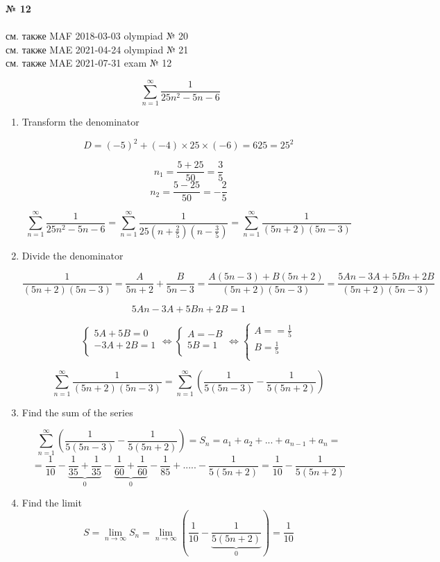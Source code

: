 \documentclass{article}
\begin{document}
\textbf{№ 12} 
\\
\\ см. также {\color{blue}MAF} 2018-03-03 olympiad № 20
\\ см. также {\color{red}MAE} 2021-04-24 olympiad № 21
\\ см. также {\color{red}MAE} 2021-07-31 exam № 12

$$\sum_{n=1}^{\infty} \frac{1}{25n^2-5n-6}$$

\begin{enumerate}

\item Transform the denominator

$$D = (-5)^2 + (-4)\times25\times(-6)=625=25^2$$

$$n_1 = \frac{5+25}{50}=\frac{3}{5}$$
$$n_2 = \frac{5-25}{50}=-\frac{2}{5}$$

$$\sum_{n=1}^{\infty} \frac{1}{25n^2-5n-6} = \sum_{n=1}^{\infty} \frac{1}{25(n+\frac{2}{5})(n-\frac{3}{5})} = \sum_{n=1}^{\infty} \frac{1}{(5n+2)(5n-3)}$$

\item Divide the denominator

$$\frac{1}{(5n+2)(5n-3)} = \frac{A}{5n+2} + \frac{B}{5n-3} 
= \frac{A(5n-3)+B(5n+2)}{(5n+2)(5n-3)} 
= \frac{5An-3A+5Bn+2B}{(5n+2)(5n-3)}$$

$$5An-3A+5Bn+2B = 1$$

$$
\left\{
  \begin{array}{ccc}
    5A + 5B = 0 \\
    -3A+2B = 1 \\
  \end{array}\Leftrightarrow
\right.
\left\{
  \begin{array}{ccc}
    A = -B \\
    5B = 1 \\
  \end{array}\Leftrightarrow
\right.
\left\{
  \begin{array}{ccc}
    A = =\frac{1}{5} \\
    B = \frac{1}{5} \\
  \end{array}
\right.
$$

$$ \sum_{n=1}^{\infty} \frac{1}{(5n+2)(5n-3)} = 
\sum_{n=1}^{\infty} \left(\frac{1}{5(5n-3)} - \frac{1}{5(5n+2)}\right) $$

\item Find the sum of the series

$$ \sum_{n=1}^{\infty} \left(\frac{1}{5(5n-3)} - \frac{1}{5(5n+2)}\right) 
= S_n = a_1+a_2+...+a_{n-1}+a_n = $$
$$ = \frac{1}{10} - \underbrace{\frac{1}{35} + \frac{1}{35}}_{0} - \underbrace{\frac{1}{60} + \frac{1}{60}}_{0} - \frac{1}{85} + ..... - \frac{1}{5(5n+2)} = \frac{1}{10} - \frac{1}{5(5n+2)}$$

\item Find the limit
$$S = \lim_{n\to\infty} S_n 
= \lim_{n\to\infty} \left(\frac{1}{10} - \underbrace{\frac{1}{5(5n+2)}}_{0}\right) 
= \frac{1}{10} $$


\end{enumerate}
\end{document}
